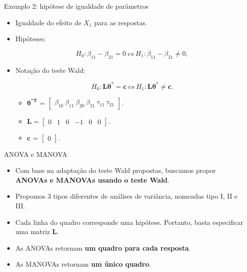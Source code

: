 \documentclass[
  ignorenonframetext,
  serif,
  professionalfont,
  usenames,
  dvipsnames,
  aspectratio = 169]{beamer}
\begin{document}
\begin{frame}{Exemplo 2: hipótese de igualdade de parâmetros}
\protect\hypertarget{exemplo-2-hipuxf3tese-de-igualdade-de-paruxe2metros}{}
\begin{itemize}
  \itemsep 2ex
  
  \item Igualdade do efeito de $X_1$ para as respostas.

  \item Hipóteses:

$$
H_0: \beta_{11} - \beta_{21} = 0 \ vs \ H_1: \beta_{11} - \beta_{21} \neq 0,
$$

  \item Notação do teste Wald:
  
$$H_0: \boldsymbol{L}\boldsymbol{\theta^{*}} = \boldsymbol{c} \ vs \ H_1: \boldsymbol{L}\boldsymbol{\theta^{*}} \neq \boldsymbol{c}.$$  

  \begin{itemize}
  
    \item $\boldsymbol{\theta^{*T}}$ = $\begin{bmatrix} \beta_{10} \  \beta_{11} \ \beta_{20} \ \beta_{21} \ \tau_{11} \ \tau_{21} \end{bmatrix}$.

    \item $\boldsymbol{L} = \begin{bmatrix} 0 & 1 & 0 & -1 & 0 & 0  \end{bmatrix}.$
 
  \item $\boldsymbol{c}$ = $\begin{bmatrix} 0 \end{bmatrix}.$ 

  \end{itemize}
  
\end{itemize}
\end{frame}

\begin{frame}{ANOVA e MANOVA}
\protect\hypertarget{anova-e-manova-1}{}
\begin{itemize}
    \itemsep 2ex

  \item Com base na adaptação do teste Wald propostas, buscamos propor \textbf{ANOVAs e MANOVAs usando o teste Wald}.

  \item Propomos 3 tipos diferentes de análises de variância, nomeadas tipo I, II e III.

  \item Cada linha do quadro corresponde uma hipótese. Portanto, basta especificar uma matriz $\boldsymbol{L}$.

  \item As ANOVAs retornam \textbf{um quadro para cada resposta}.

  \item As MANOVAs retornam \textbf{um único quadro}. 
\end{itemize}
\end{frame}
\end{document}
